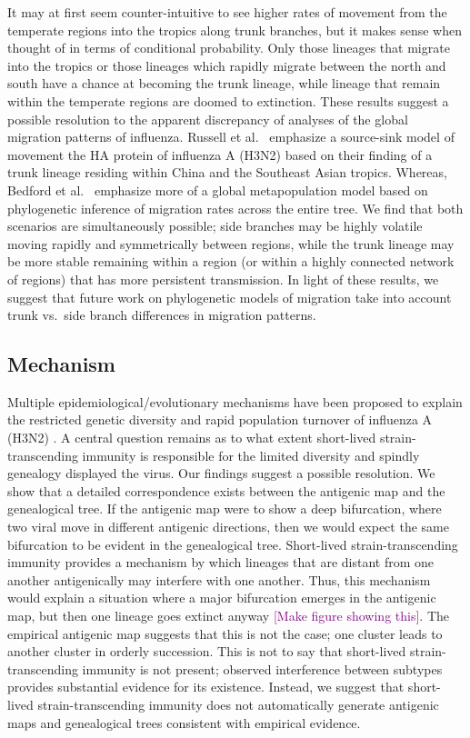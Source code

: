 \documentclass[11pt,oneside,letterpaper]{article}
\def\tbc#1{\textcolor{purple}{[#1]}}
\begin{document}
It may at first seem counter-intuitive to see higher rates of movement from the temperate regions into the tropics along trunk branches, but it makes sense when thought of in terms of conditional probability.  Only those lineages that migrate into the tropics or those lineages which rapidly migrate between the north and south have a chance at becoming the trunk lineage, while lineage that remain within the temperate regions are doomed to extinction.  These results suggest a possible resolution to the apparent discrepancy of analyses of the global migration patterns of influenza.  Russell et al.\ \cite{Russell08} emphasize a source-sink model of movement the HA protein of influenza A (H3N2) based on their finding of a trunk lineage residing within China and the Southeast Asian tropics.  Whereas, Bedford et al.\ \cite{Bedford10} emphasize more of a global metapopulation model based on phylogenetic inference of migration rates across the entire tree.  We find that both scenarios are simultaneously possible; side branches may be highly volatile moving rapidly and symmetrically between regions, while the trunk lineage may be more stable remaining within a region (or within a highly connected network of regions) that has more persistent transmission.  In light of these results, we suggest that future work on phylogenetic models of migration take into account trunk vs.\ side branch differences in migration patterns.


\subsection*{Mechanism}

Multiple epidemiological/evolutionary mechanisms have been proposed to explain the restricted genetic diversity and rapid population turnover of influenza A (H3N2) \cite{Ferguson03,Tria05,Koelle06,Recker07}.  A central question remains as to what extent short-lived strain-transcending immunity is responsible for the limited diversity and spindly genealogy displayed the virus.  Our findings suggest a possible resolution.  We show that a detailed correspondence exists between the antigenic map and the genealogical tree.  If the antigenic map were to show a deep bifurcation, where two viral move in different antigenic directions, then we would expect the same bifurcation to be evident in the genealogical tree.  Short-lived strain-transcending immunity provides a mechanism by which lineages that are distant from one another antigenically may interfere with one another.  Thus, this mechanism would explain a situation where a major bifurcation emerges in the antigenic map, but then one lineage goes extinct anyway \tbc{Make figure showing this}.  The empirical antigenic map \cite{Smith04} suggests that this is not the case; one cluster leads to another cluster in orderly succession.  This is not to say that short-lived strain-transcending immunity is not present; observed interference between subtypes \cite{Ferguson03} provides substantial evidence for its existence.  Instead, we suggest that short-lived strain-transcending immunity does not automatically generate antigenic maps and genealogical trees consistent with empirical evidence.  
\end{document}
